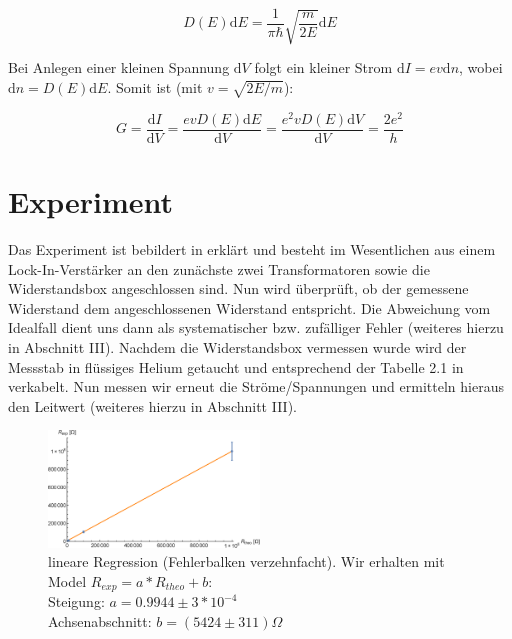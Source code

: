 \documentclass[aps,twocolumn,secnumarabic,nobalancelastpage,amsmath,amssymb,
nofootinbib,superscriptaddress]{revtex4-1}
\begin{document}
  \begin{equation}
    D(E) \mathrm{d}E = \frac{1}{\pi \hbar} \sqrt{\frac{m}{2 E}}\mathrm{d}E
  \end{equation}

Bei Anlegen einer kleinen Spannung $\mathrm{d}V$ folgt ein kleiner Strom $\mathrm{d}I = e v \mathrm{d}n$,
wobei $\mathrm{d}n = D(E)\mathrm{d}E$. Somit ist (mit $v = \sqrt{2E/m}$):

  \begin{equation}
    G = \frac{\mathrm{d}I}{\mathrm{d}V} = \frac{evD(E)\mathrm{d}E}{\mathrm{d}V} = \frac{e^2vD(E)\mathrm{d}V}{\mathrm{d}V} = \frac{2e^2}{h}
  \end{equation}






\section{Experiment}

Das Experiment ist bebildert in \cite{skript11} erklärt und besteht im Wesentlichen
aus einem Lock-In-Verstärker an den zunächste zwei Transformatoren sowie die
Widerstandsbox angeschlossen sind. Nun wird überprüft, ob der gemessene Widerstand
dem angeschlossenen Widerstand entspricht. Die Abweichung vom Idealfall dient uns
dann als systematischer bzw. zufälliger Fehler (weiteres hierzu in Abschnitt III).
Nachdem die Widerstandsbox vermessen wurde wird der Messstab in flüssiges Helium
getaucht und entsprechend der Tabelle 2.1 in \cite{skript11} verkabelt. Nun messen
wir erneut die Ströme/Spannungen und ermitteln hieraus den Leitwert (weiteres
hierzu in Abschnitt III).

\begin{figure}[h]
  \centering
  \includegraphics[width=0.5\textwidth]{Berechnung-Bilder/box.eps}
  \caption{
  lineare Regression (Fehlerbalken verzehnfacht). Wir erhalten mit
  Model $R_{exp}=a*R_{theo}+b$:\\
  Steigung:  $a = 0.9944 \pm 3*10^{-4}$\\
  Achsenabschnitt:  $b = (5424 \pm 311) \Omega$
  }
  \label{fig:box}
\end{figure}
\end{document}
